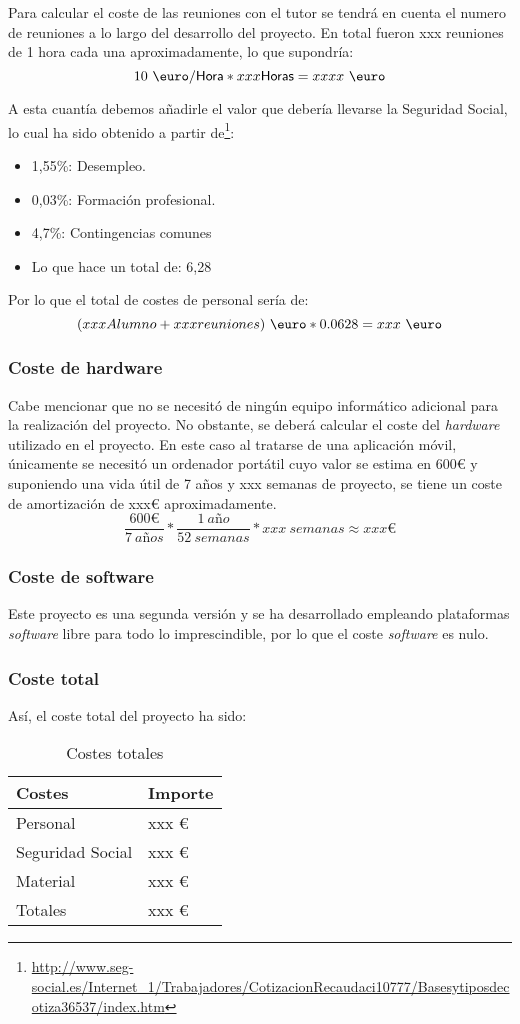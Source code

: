 Para calcular el coste de las reuniones con el tutor se tendrá en cuenta el numero de reuniones a lo largo del desarrollo del proyecto. En total fueron xxx reuniones de 1 hora cada una aproximadamente, lo que supondría:
\[10~{\mbox{\euro}} /\textsf{Hora}*xxx\textsf{Horas}=xxxx ~{\mbox{\euro}} \]

A esta cuantía debemos añadirle el valor que debería llevarse la Seguridad Social, lo cual ha sido obtenido a partir de\footnote{\url{http://www.seg-social.es/Internet_1/Trabajadores/CotizacionRecaudaci10777/Basesytiposdecotiza36537/index.htm}}:
\begin{itemize}
\item 1,55\%: Desempleo.
\item 0,03\%: Formación profesional.
\item 4,7\%: Contingencias comunes 
\item Lo que hace un total de: 6,28%
\end{itemize}
Por lo que el total de costes de personal sería de:
\[(xxxAlumno + xxxreuniones)~{\mbox{\euro}}*0.0628=xxx~{\mbox{\euro}}\]
\subsubsection{Coste de hardware}
Cabe mencionar que no se necesitó de ningún equipo informático adicional para la realización del proyecto. No obstante, se deberá calcular el coste del \textit{hardware} utilizado en el proyecto.
En este caso al tratarse de una aplicación móvil, únicamente se necesitó un ordenador portátil cuyo valor se estima en 600\euro{} y suponiendo una vida útil de 7 años y xxx semanas de proyecto, se tiene un coste de amortización de xxx\euro{} aproximadamente.
\[ \frac{600\euro}{7 \ a\textit{ñ}os} * \frac{1 \ a\textit{ñ}o}{52 \ semanas} * xxx \ semanas \approx xxx\euro \]

\subsubsection{Coste de software}
Este proyecto es una segunda versión y se ha desarrollado empleando plataformas \textit{software} libre para todo lo imprescindible, por lo que el coste \textit{software} es nulo.
\subsubsection{Coste total}
Así, el coste total del proyecto ha sido:
\begin{table}[]
\centering
\caption{Costes totales}
\label{tab:costes}
\begin{tabular}{p{4cm} p{2cm}}
\toprule
Costes & Importe \\ \midrule
Personal         & xxx \euro{}   \\ 
Seguridad Social & xxx \euro{} \\ 
Material         & xxx \euro{}   \\ 
Totales          & xxx \euro{} \\ \bottomrule
\end{tabular}
\end{table}
